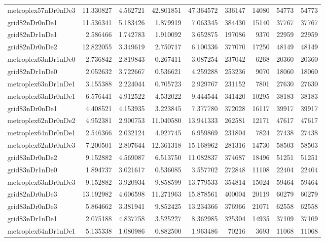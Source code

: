 \begin{longtable}{|l|r|r|r|r|r|r|r|r|}
metroplex57nDr0nDe3 & 11.330827 & 4.562721 & 42.801851 & 47.364572 & 336147 & 14080 & 54773 & 54773 \\
grid82nDr0nDe1 & 11.536341 & 5.183426 & 1.879919 & 7.063345 & 384430 & 15140 & 37767 & 37767 \\
grid82nDr1nDe1 & 2.586466 & 1.742783 & 1.910092 & 3.652875 & 197086 & 9370 & 22959 & 22959 \\
grid82nDr0nDe2 & 12.822055 & 3.349619 & 2.750717 & 6.100336 & 377070 & 17250 & 48149 & 48149 \\
metroplex63nDr1nDe0 & 2.736842 & 2.819843 & 0.267411 & 3.087254 & 237042 & 6268 & 20360 & 20360 \\
grid82nDr1nDe0 & 2.052632 & 3.722667 & 0.536621 & 4.259288 & 253236 & 9070 & 18060 & 18060 \\
metroplex63nDr1nDe1 & 3.155388 & 2.224044 & 0.705723 & 2.929767 & 231152 & 7801 & 27630 & 27630 \\
metroplex63nDr0nDe1 & 6.576441 & 4.912522 & 4.532022 & 9.444544 & 341420 & 10295 & 38183 & 38183 \\
grid83nDr0nDe1 & 4.408521 & 4.153935 & 3.223845 & 7.377780 & 372028 & 16117 & 39917 & 39917 \\
metroplex62nDr0nDe2 & 4.952381 & 2.900753 & 11.040580 & 13.941333 & 262581 & 12171 & 47617 & 47617 \\
metroplex64nDr0nDe1 & 2.546366 & 2.032124 & 4.927745 & 6.959869 & 231804 & 7824 & 27438 & 27438 \\
metroplex62nDr0nDe3 & 7.200501 & 2.807644 & 12.361318 & 15.168962 & 281316 & 14730 & 58503 & 58503 \\
grid83nDr0nDe2 & 9.152882 & 4.569087 & 6.513750 & 11.082837 & 374687 & 18496 & 51251 & 51251 \\
grid83nDr1nDe0 & 1.894737 & 3.021617 & 0.536085 & 3.557702 & 272848 & 11108 & 22404 & 22404 \\
metroplex63nDr0nDe3 & 9.152882 & 3.920934 & 9.858599 & 13.779533 & 354814 & 15024 & 59464 & 59464 \\
grid82nDr0nDe3 & 13.192982 & 4.606598 & 11.271963 & 15.878561 & 400004 & 20119 & 60279 & 60279 \\
grid83nDr0nDe3 & 5.864662 & 3.381941 & 9.852425 & 13.234366 & 376966 & 21071 & 62558 & 62558 \\
grid83nDr1nDe1 & 2.075188 & 4.837758 & 3.525227 & 8.362985 & 325304 & 14935 & 37109 & 37109 \\
metroplex64nDr1nDe1 & 5.135338 & 1.080986 & 0.882500 & 1.963486 & 70216 & 3693 & 11068 & 11068 \\

\end{longtable}
